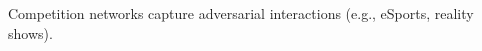 \documentclass[preview]{standalone}
\begin{document}
Competition networks capture adversarial interactions (e.g., eSports, reality shows).\\
\end{document}
